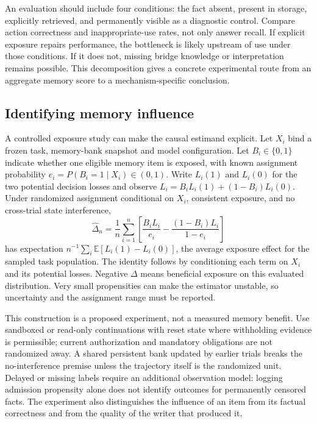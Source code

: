 An evaluation should include four conditions: the fact absent, present in storage, explicitly retrieved, and permanently visible as a diagnostic control. Compare action correctness and inappropriate-use rates, not only answer recall. If explicit exposure repairs performance, the bottleneck is likely upstream of use under those conditions. If it does not, missing bridge knowledge or interpretation remains possible. This decomposition gives a concrete experimental route from an aggregate memory score to a mechanism-specific conclusion.

\subsection{Identifying memory influence}
A controlled exposure study can make the causal estimand explicit. Let $X_i$ bind a frozen task, memory-bank snapshot and model configuration. Let $B_i\in\{0,1\}$ indicate whether one eligible memory item is exposed, with known assignment probability $e_i=P(B_i=1\mid X_i)\in(0,1)$. Write $L_i(1)$ and $L_i(0)$ for the two potential decision losses and observe $L_i=B_iL_i(1)+(1-B_i)L_i(0)$. Under randomized assignment conditional on $X_i$, consistent exposure, and no cross-trial state interference,
\begin{equation}
 \widehat\Delta_n=\frac1n\sum_{i=1}^n
 \left[\frac{B_iL_i}{e_i}-\frac{(1-B_i)L_i}{1-e_i}\right]
\end{equation}
has expectation $n^{-1}\sum_i\mathbb E[L_i(1)-L_i(0)]$, the average exposure effect for the sampled task population. The identity follows by conditioning each term on $X_i$ and its potential losses. Negative $\Delta$ means beneficial exposure on this evaluated distribution. Very small propensities can make the estimator unstable, so uncertainty and the assignment range must be reported.

This construction is a proposed experiment, not a measured memory benefit. Use sandboxed or read-only continuations with reset state where withholding evidence is permissible; current authorization and mandatory obligations are not randomized away. A shared persistent bank updated by earlier trials breaks the no-interference premise unless the trajectory itself is the randomized unit. Delayed or missing labels require an additional observation model: logging admission propensity alone does not identify outcomes for permanently censored facts. The experiment also distinguishes the influence of an item from its factual correctness and from the quality of the writer that produced it.
